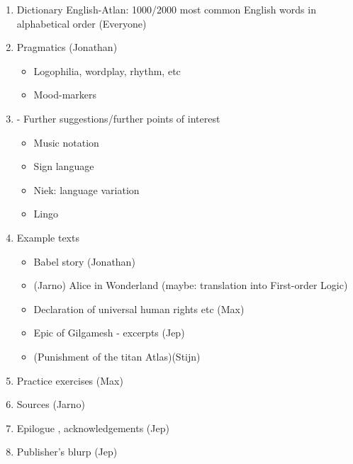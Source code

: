\documentclass[a3paper]{article}
\begin{document}
\begin{enumerate}
\item Dictionary English-Atlan: 1000/2000 most common English words in alphabetical order (Everyone)                                                            
\item Pragmatics (Jonathan)                                                                                                                           \begin{itemize}
\item Logophilia, wordplay, rhythm, etc
\item Mood-markers
\end{itemize}
\item - Further suggestions/further points of interest
\begin{itemize}
\item Music notation
\item Sign language
\item Niek: language variation
\item Lingo 
\end{itemize}
\item Example texts                                                                                                                                  
\begin{itemize}
	\item Babel story (Jonathan)                                                                                                                                     
\item(Jarno) Alice in Wonderland (maybe: translation into First-order Logic)                                                                          
\item Declaration of universal human rights etc (Max)                                                                                                        
\item Epic of Gilgamesh - excerpts (Jep)

\item (Punishment of the titan Atlas)(Stijn)
\end{itemize}
\item Practice exercises (Max)                                                                                                                 
\item Sources (Jarno)
\item Epilogue , acknowledgements (Jep)                                                                                                          
\item[] Publisher's blurp (Jep)
\end{enumerate}
\end{document}
